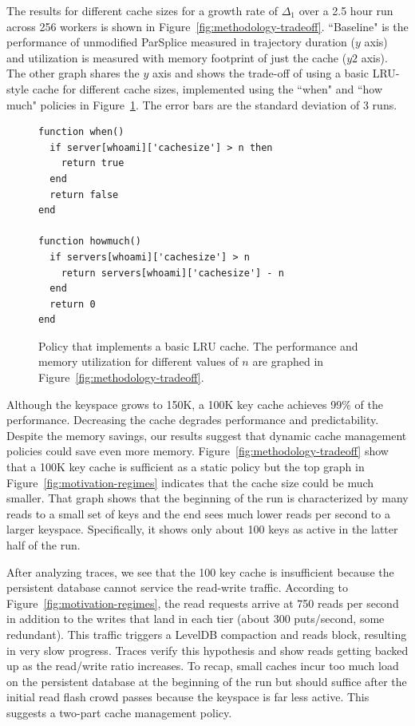 The results for different cache sizes for a growth rate of \(\Delta_1\) over a
2.5 hour run across 256 workers is shown in
Figure~\ref{fig:methodology-tradeoff}.  ``Baseline" is the performance of
unmodified ParSplice  measured in trajectory duration (\(y\) axis) and
utilization is measured with memory footprint of just the cache (\(y2\) axis).
The other graph shares the \(y\) axis and shows the trade-off of using a basic
LRU-style cache for different cache sizes, implemented using the ``when" and
``how much" policies in Figure~\ref{src:lru}.  The error bars are the standard
deviation of 3 runs. 

\begin{figure}[t]
\footnotesize
\centering
\begin{verbatim}
function when()
  if server[whoami]['cachesize'] > n then
    return true
  end
  return false
end

function howmuch()
  if servers[whoami]['cachesize'] > n
    return servers[whoami]['cachesize'] - n
  end
  return 0
end
\end{verbatim}
\caption{Policy that implements a basic LRU cache. The performance and memory
utilization for different values of \(n\) are graphed in
Figure~\ref{fig:methodology-tradeoff}.
\label{src:lru}}
\end{figure}

Although the keyspace grows to 150K, a 100K key cache achieves 99\% of the
performance. Decreasing the cache degrades performance and predictability.
Despite the memory savings, our results suggest that dynamic cache management
policies could save even more memory.  Figure~\ref{fig:methodology-tradeoff}
show that a 100K key cache is sufficient as a static policy but the top graph
in Figure~\ref{fig:motivation-regimes} indicates that the cache size could be
much smaller. That graph shows that the beginning of the run is characterized
by many reads to a small set of keys and the end sees much lower reads per
second to a larger keyspace. Specifically, it shows only about 100 keys as
active in the latter half of the run.

After analyzing traces, we see that the 100 key cache is insufficient because
the persistent database cannot service the read-write traffic.  According to
Figure~\ref{fig:motivation-regimes}, the read requests arrive at 750 reads per
second in addition to the writes that land in each tier (about 300 puts/second,
some redundant). This traffic triggers a LevelDB compaction and reads block,
resulting in very slow progress.  Traces verify this hypothesis and show reads
getting backed up as the read/write ratio increases. To recap, small caches
incur too much load on the persistent database  at the beginning of the run but
should suffice after the initial read flash crowd passes because
the keyspace is far less active. This suggests a two-part cache management
policy.


